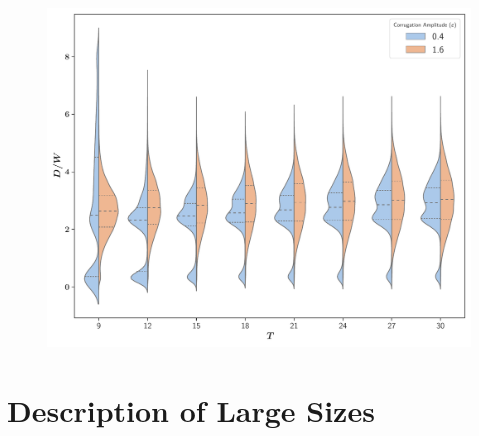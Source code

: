 

\begin{figure}
\centering
\includegraphics{plots/drop_stats/amp_dist_compare.pdf}
	\caption{\blindtext}
\label{tseries_comp}
\end{figure}


\section{Description of Large Sizes}







